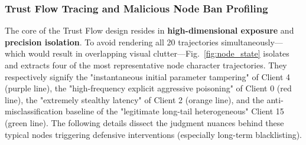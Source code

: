 \documentclass[runningheads]{llncs}
\begin{document}
\subsubsection{Trust Flow Tracing and Malicious Node Ban Profiling}
The core of the Trust Flow design resides in \textbf{high-dimensional exposure} and \textbf{precision isolation}. To avoid rendering all 20 trajectories simultaneously---which would result in overlapping visual clutter---Fig.~\ref{fig:node_state} isolates and extracts four of the most representative node character trajectories. They respectively signify the "instantaneous initial parameter tampering" of Client 4 (purple line), the "high-frequency explicit aggressive poisoning" of Client 0 (red line), the "extremely stealthy latency" of Client 2 (orange line), and the anti-misclassification baseline of the "legitimate long-tail heterogeneous" Client 15 (green line). The following details dissect the judgment nuances behind these typical nodes triggering defensive interventions (especially long-term blacklisting).
\end{document}
